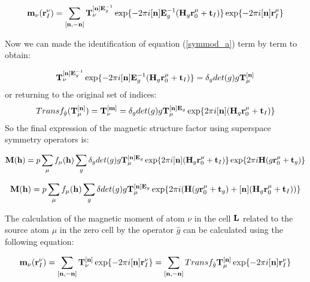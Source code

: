 \documentclass[10pt]{article}
\begin{document}
\begin{equation}  
{\bf m}_\nu({\bf r}_I^{\nu})=\sum\limits_{[{\bf n},-{\bf n}]}  {\bf T}_{\nu}^{[{\bf n}]{\bf E}_g^{-1}} \exp\{-2\pi i[{\bf n}]{\bf E}_g^{-1} ({\bf H}_g{\bf r}_0^\mu+ {\bf t}_I)\} \exp\{-2\pi i[{\bf n}] {\bf r}_I^\mu\}  
\end{equation}

Now we can made the identification of equation (\ref{symmod_a}) term by term to obtain:

\begin{equation}
{\bf T}_{\nu}^{[{\bf n}]{\bf E}_g^{-1}} \exp\{-2\pi i[{\bf n}]{\bf E}_g^{-1} ({\bf H}_g{\bf r}_0^\mu+ {\bf t}_I)\}=\delta_g det(g) g {\bf T}_{\mu}^{[{\bf n}]}  
\end{equation}
or returning to the original set of indices:
\begin{equation}
Transf_{\hat g}({\bf T}_{\mu}^{[{\bf n}]}) ={\bf T}_{\nu}^{[{\bf m}]} =\delta_g det(g) g {\bf T}_{\mu}^{[{\bf n}]{\bf E}_g}  \exp\{2\pi i[{\bf n}] ({\bf H}_g{\bf r}_0^\mu+ {\bf t}_I)\}
\end{equation}
So the final expression of the magnetic structure factor using superspace symmetry operators is:

\begin{equation} \label{magstrf_final1}
{\bf M}({\bf h})=p\sum_{{\mu}} f_{\mu}({\bf h}) \sum_g \delta_g det(g) g {\bf T}_{\mu}^{[{\bf n}]{\bf E}_g}  \exp\{2\pi i[{\bf n}] ({\bf H}_g{\bf r}_0^\mu+ {\bf t}_I)\} \exp\{2\pi i {\bf H}(g{\bf r}_0^\mu+{\bf t}_g) \}    
\end{equation}

\begin{equation} \label{magstrf_final2}
{\bf M}({\bf h})=p\sum_{{\mu}} f_{\mu}({\bf h}) \sum_g \delta det(g) g {\bf T}_{\mu}^{[{\bf n}]{\bf E}_g}   \exp\{2\pi i ( {\bf H}(g{\bf r}_0^\mu+{\bf t}_g) + [{\bf n}] ({\bf H}_g{\bf r}_0^\mu+ {\bf t}_I)) \}    
\end{equation}

The calculation of the magnetic moment of atom $\nu$ in the cell ${\bf L}$ related to the source atom $\mu$ in the zero cell by the operator $\hat g$ can be calculated using the following equation:

\begin{equation} \label{momentL}
{\bf m}_\nu({\bf r}_I^{\nu}) =\sum_{[{\bf n},-{\bf n}]}  {\bf T}_{\nu}^{[{\bf n}]} \exp\{-2\pi i[{\bf n}] {\bf r}_I^{\nu}\}=\sum_{[{\bf n},-{\bf n}]}  Transf_{\hat g}{\bf T}_{\mu}^{[{\bf n}]} \exp\{-2\pi i[{\bf n}] {\bf r}_I^{\nu}\}
\end{equation}
\end{document}
